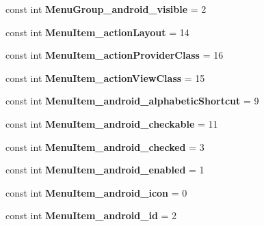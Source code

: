 \begin{DoxyCompactItemize}
const int {\bfseries Menu\+Group\+\_\+android\+\_\+visible} = 2
\item 
\mbox{\label{classXaria_1_1Resource_1_1Styleable_a1dcd614be1e2756208533a98ecc9410b}} 
const int {\bfseries Menu\+Item\+\_\+action\+Layout} = 14
\item 
\mbox{\label{classXaria_1_1Resource_1_1Styleable_ae8231ea563a02ae9d213c1021951197e}} 
const int {\bfseries Menu\+Item\+\_\+action\+Provider\+Class} = 16
\item 
\mbox{\label{classXaria_1_1Resource_1_1Styleable_aebdaff1b50dd2f064bf7c8cc3564cc47}} 
const int {\bfseries Menu\+Item\+\_\+action\+View\+Class} = 15
\item 
\mbox{\label{classXaria_1_1Resource_1_1Styleable_a6785936c02795fff2dd5db66285409e6}} 
const int {\bfseries Menu\+Item\+\_\+android\+\_\+alphabetic\+Shortcut} = 9
\item 
\mbox{\label{classXaria_1_1Resource_1_1Styleable_ae98bc1e0c03ac006a57d9145b53aa098}} 
const int {\bfseries Menu\+Item\+\_\+android\+\_\+checkable} = 11
\item 
\mbox{\label{classXaria_1_1Resource_1_1Styleable_a0ed24821e50829e464f94f296f419102}} 
const int {\bfseries Menu\+Item\+\_\+android\+\_\+checked} = 3
\item 
\mbox{\label{classXaria_1_1Resource_1_1Styleable_a6d4e5edfb8df0022b67310ca6fa4d453}} 
const int {\bfseries Menu\+Item\+\_\+android\+\_\+enabled} = 1
\item 
\mbox{\label{classXaria_1_1Resource_1_1Styleable_a209cf63ef13c332221850343d6b0bdb7}} 
const int {\bfseries Menu\+Item\+\_\+android\+\_\+icon} = 0
\item 
\mbox{\label{classXaria_1_1Resource_1_1Styleable_a780d468759db3a05d5e343ddfe6aaeda}} 
const int {\bfseries Menu\+Item\+\_\+android\+\_\+id} = 2
\item 

\end{DoxyCompactItemize}
